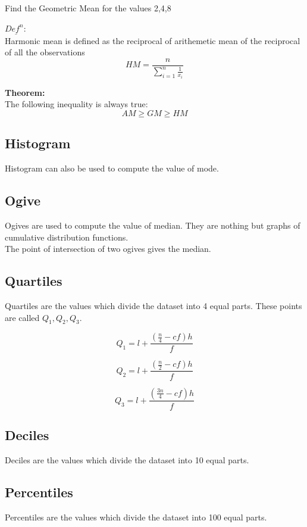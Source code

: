 \documentclass[11pt,letterpaper]{article}
\newenvironment{problem}[2][Problem]                                  
        {\begin{tcolorbox}[colback=white,colframe=gray!50,title=#1 #2]}
        {\end{tcolorbox}}
\newenvironment{mytheorem}                    
        {\begin{mdframed}\textbf{Theorem:} \\}
        {\end{mdframed}}
\newenvironment{definition}
	{\begin{mdframed}$\underline{\textit{Def}^\textit{n}:} $\\}
	{\end{mdframed}}
\begin{document}
\begin{problem}7
   Find the Geometric Mean for the values 2,4,8
\end{problem}

\begin{definition}
   Harmonic mean is defined as the reciprocal of arithemetic mean of the reciprocal of all the observations
   \[
      HM = \frac{n}{\sum_{i=1}^{n} \frac{1}{x_i}}
   \]
\end{definition}

\begin{mytheorem}
   The following inequality is always true:
   \[
      AM \geq GM \geq HM
   \]
\end{mytheorem}

\subsection{Histogram}
Histogram can also be used to compute the value of mode. 

\subsection{Ogive}
Ogives are used to compute the value of median. 
They are nothing but graphs of cumulative distribution functions. \\ 
The point of intersection of two ogives gives the median. 

\subsection{Quartiles}
Quartiles are the values which divide the dataset into 4 equal parts. These points are called $ Q_1, Q_2, Q_3$. 

\[
  Q_1 = l + \frac{\left( \frac{n}{4} - cf \right)h}{f}
\]

\[
  Q_2 = l + \frac{\left( \frac{n}{2} - cf \right)h}{f}
\]

\[
  Q_3 = l + \frac{\left( \frac{3n}{4} - cf \right)h}{f}
\]
\subsection{Deciles}
Deciles are the values which divide the dataset into 10 equal parts. 

\subsection{Percentiles}
Percentiles are the values which divide the dataset into 100 equal parts. 
\end{document}
